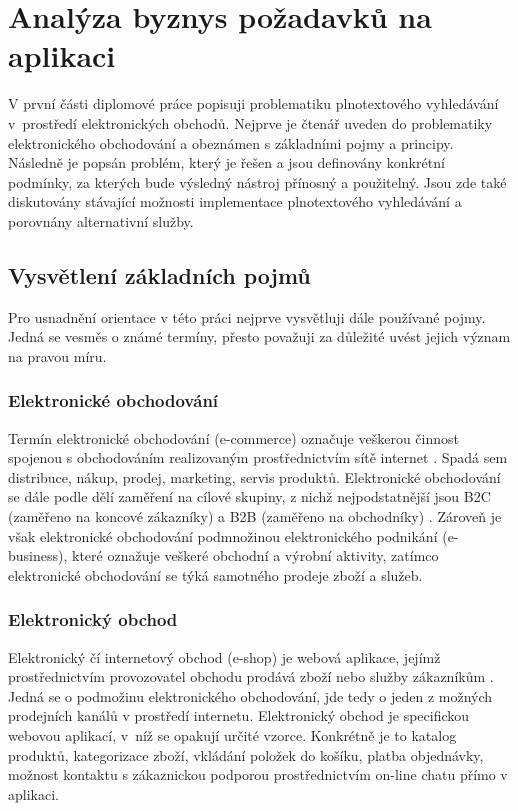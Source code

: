 \documentclass[FM,DP]{tulthesis}
\begin{document}
\chapter{Analýza byznys požadavků na aplikaci}

V první části diplomové práce popisuji problematiku plnotextového vyhledávání 
v~prostředí elektronických obchodů. Nejprve je čtenář uveden do problematiky elektronického
obchodování a obeznámen s základními pojmy a principy. Následně je popsán problém, 
který je řešen a jsou definovány konkrétní podmínky, za kterých bude výsledný nástroj
přínosný a použitelný. Jsou zde také diskutovány stávající možnosti implementace
plnotextového vyhledávání a porovnány alternativní služby.

\section{Vysvětlení základních pojmů}

Pro usnadnění orientace v této práci nejprve vysvětluji dále používané pojmy. Jedná se 
vesměs o známé termíny, přesto považuji za důležité uvést jejich význam na pravou míru.

\subsection*{Elektronické obchodování}

Termín elektronické obchodování (e-commerce) označuje veškerou činnost spojenou s obchodováním
realizovaným prostřednictvím sítě internet \cite[strana~11]{e-commerce}. Spadá sem distribuce, nákup, 
prodej, marketing, servis produktů. Elektronické obchodování se dále podle dělí zaměření na cílové 
skupiny, z nichž nejpodstatnější jsou B2C (zaměřeno na koncové zákazníky) a B2B (zaměřeno na obchodníky) 
\cite[strana~17]{e-commerce}. Zároveň je však elektronické obchodování podmnožinou 
elektronického podnikání (e-business), které oznažuje veškeré obchodní a výrobní aktivity, 
zatímco elektronické obchodování se týká samotného prodeje zboží a služeb.

\subsection*{Elektronický obchod}

Elektronický čí internetový obchod (e-shop) je webová aplikace, jejímž prostřednictvím 
provozovatel obchodu prodává zboží nebo služby zákazníkům \cite[strana~16]{e-commerce}.
Jedná se o podmožinu elektronického obchodování, jde tedy o jeden z možných prodejních 
kanálů v prostředí internetu. Elektronický obchod je specifickou webovou aplikací, v~níž 
se opakují určité vzorce. Konkrétně je to katalog produktů, kategorizace zboží, 
vkládání položek do košíku, platba objednávky, možnost kontaktu s zákaznickou podporou 
prostřednictvím on-line chatu přímo v aplikaci.
\end{document}
